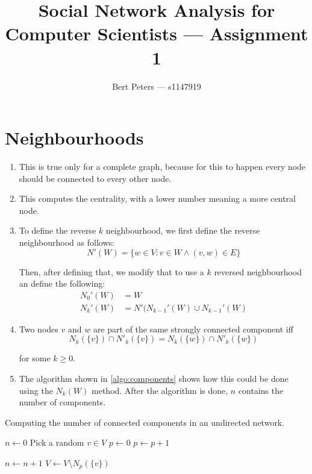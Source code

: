 \documentclass[12pt,a4paper,hidelinks]{article}
\author{Bert Peters --- s1147919}
\title{Social Network Analysis for Computer Scientists --- Assignment 1}
\begin{document}
\maketitle

\section{Neighbourhoods}

\begin{enumerate}
	\item This is true only for a complete graph, because for this to happen every node should be connected to every other node.
	
	\item This computes the centrality, with a lower number meaning a more central node.
	
	\item To define the reverse $k$ neighbourhood, we first define the reverse neighbourhood as follows:
	$$
		N'(W) = \{ w \in V : v \in W \land (v, w) \in E \}
	$$
	
	Then, after defining that, we modify that to use a $k$ reversed neighbourhood an define the following:
	\begin{align*}
		N_0'(W) & = W \\
		N_k'(W) & = N'(N_{k - 1}'(W) \cup N_{k - 1}'(W)
	\end{align*}
	
	\item Two nodes $v$ and $w$ are part of the same strongly connected component iff
	$$
		N_k(\{v\}) \cap N'_k(\{v\}) = N_k(\{w\}) \cap N'_k(\{w\})
	$$
	
	for some $k \geq 0$.
	
	\item The algorithm shown in \autoref{algo:components} shows how this could be done using the $N_k(W)$ method. After the algorithm is done, $n$ contains the number of components.
\end{enumerate}

\begin{algorithm}
\caption{Computing the number of connected components in an undirected network.}
\label{algo:components}

\begin{algorithmic}
	\State $n \gets 0$
		\State Pick a random $v \in V$
		\State $p \gets 0$
			\State $p \gets p + 1$
		\EndWhile
		
		\State $n \gets n + 1$
		\State $V \gets V \setminus N_p(\{v\})$
	\EndWhile
\end{algorithmic}

\end{algorithm}
\end{document}
